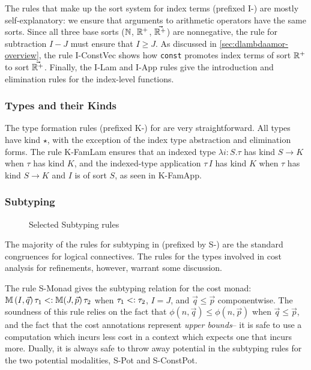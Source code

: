 The rules that make up the sort system for index terms (prefixed I-) are mostly self-explanatory: we ensure that arguments to arithmetic operators have the same sorts.
Since all three base sorts ($\mathbb{N}$, $\mathbb{R}^+$, $\vec{\mathbb{R}^+}$) are nonnegative, the rule for subtraction $I - J$ must ensure that $I \geq J$. As discussed in \autoref{sec:dlambdaamor-overview}, the rule I-ConstVec shows how \texttt{const} promotes index terms of sort $\mathbb{R}^+$ to sort $\vec{\mathbb{R}^+}$. Finally, the I-Lam and I-App rules give the introduction and elimination rules for the index-level functions.

\subsubsection{Types and their Kinds}
The type formation rules (prefixed K-) for \dlambdaamor are very straightforward. All types have kind $\star$, with the exception of the index type abstraction and elimination forms. The rule K-FamLam ensures that an indexed type $\lambda i : S. \tau$ has kind $S \to K$ when $\tau$ has kind $K$, and the indexed-type application $\tau \, I$ has kind $K$ when $\tau$ has kind $S \to K$ and $I$ is of sort $S$, as seen in K-FamApp.

\subsubsection{Subtyping}
\begin{figure}

\caption{Selected Subtyping rules}
\label{fig:dlambdaamor-selected-subty-rules}
\end{figure}
The majority of the rules for subtyping in \dlambdaamor (prefixed by S-) are the standard congruences for logical connectives. The rules for the types involved in cost analysis for refinements, however, warrant some discussion.

The rule S-Monad gives the subtyping relation for the cost monad: $\mathbb{M} \, (I,\vec{q}) \, \tau_1 <: \mathbb{M} (J,\vec{p}) \,\tau_2$ when $\tau_1 <: \tau_2$, $I = J$, and $\vec{q} \leq \vec{p}$ componentwise. The soundness of this rule relies on the fact that $\phi(n,\vec{q}) \leq \phi(n,\vec{p})$ when $\vec{q} \leq \vec{p}$, and the fact that the cost annotations represent \textit{upper bounds}-- it is safe to use a computation which incurs less cost in a context which expects one that incurs more. Dually, it is always safe to throw away potential in the subtyping rules for the two potential modalities, S-Pot and S-ConstPot.

